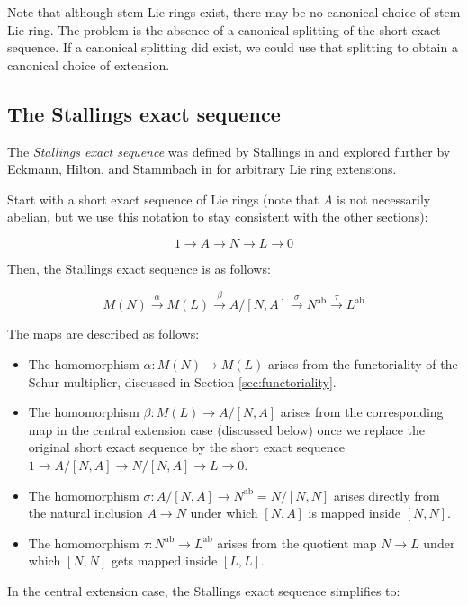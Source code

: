 \documentclass{ucetd}
\begin{document}
Note that although stem Lie rings exist, there may be no canonical choice
of stem Lie ring. The problem is the absence of a canonical splitting of
the short exact sequence. If a canonical splitting did exist, we could
use that splitting to obtain a canonical choice of extension.

\subsection{The Stallings exact sequence}

The {\em Stallings exact sequence} was defined by Stallings in
\cite{Stallings} and explored further by Eckmann, Hilton, and
Stammbach in \cite{EckmannHiltonStammbach} for arbitrary Lie ring
extensions.

Start with a short exact sequence of Lie rings (note that $A$ is not
necessarily abelian, but we use this notation to stay consistent with
the other sections):

$$1 \to A \to N \to L \to 0$$

Then, the Stallings exact sequence is as follows:

$$M(N) \stackrel{\alpha}{\to} M(L) \stackrel{\beta}{\to} A/[N,A] \stackrel{\sigma}{\to} N^{\operatorname{ab}} \stackrel{\tau}{\to} L^{\operatorname{ab}}$$

The maps are described as follows:

\begin{itemize}
\item The homomorphism $\alpha:M(N) \to M(L)$ arises from the
  functoriality of the Schur multiplier, discussed in Section
  \ref{sec:functoriality}.
\item The homomorphism $\beta:M(L) \to A/[N,A]$ arises from the
  corresponding map in the central extension case (discussed below)
  once we replace the original short exact sequence by the short exact
  sequence $1 \to A/[N,A] \to N/[N,A] \to L \to 0$.
\item The homomorphism $\sigma:A/[N,A] \to N^{\operatorname{ab}} =
  N/[N,N]$ arises directly from the natural inclusion $A \to N$ under
  which $[N,A]$ is mapped inside $[N,N]$.
\item The homomorphism $\tau:N^{\operatorname{ab}} \to
  L^{\operatorname{ab}}$ arises from the quotient map $N \to L$ under
  which $[N,N]$ gets mapped inside $[L,L]$.
\end{itemize}

In the central extension case, the Stallings exact sequence simplifies to:
\end{document}
